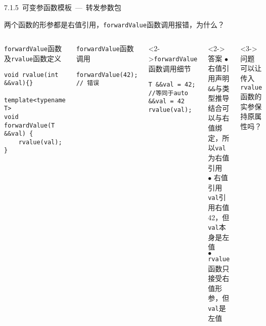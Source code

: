 \begin{frame}[fragile]{7.1.5~可变参函数模板\normalsize{~---~转发参数包}}

两个函数的形参都是\alert{右值引用}，\texttt{forwardValue}函数调用报错，为什么？

\vspace{-4mm}

\begin{columns}[t]

\begin{blueblock}{\texttt{forwardValue}函数及\texttt{rvalue}函数定义}
\vspace{-2mm}\begin{lstlisting}[moreemph={T}]
void rvalue(int &&val){}

template<typename T>
void forwardValue(T &&val) {
    rvalue(val);
}
\end{lstlisting}\vspace{-2mm}
\end{blueblock}
\begin{blueblock}{\texttt{forwardValue}函数调用}
\vspace{-2mm}\begin{lstlisting}[moreemph={T}]
forwardValue(42);   // 错误
\end{lstlisting}\vspace{-2mm}
\end{blueblock}
\begin{blueblock}<2->{\texttt{forwardValue}函数调用细节}
\vspace{-2mm}\begin{lstlisting}[moreemph={T}]
T &&val = 42;       //等同于auto &&val = 42
rvalue(val);
\end{lstlisting}\vspace{-2mm}
\end{blueblock}

\begin{greenblock}<2->{答案}
$\bullet$ 右值引用声明 \texttt{\&\&}与类型推导结合可以与右值绑定，所以\texttt{val}为右值引用\\
$\bullet$ 右值引用\texttt{val}引用右值42，但\alert{\texttt{val}本身是左值}\\
$\bullet$ \texttt{rvalue}函数只接受右值形参，但\texttt{val}是左值
\end{greenblock}
\begin{greenblock}<3->{问题}
可以让传入\texttt{rvalue}函数的\alert{实参保持原属性吗}？
\end{greenblock}

\end{columns}

\end{frame}

